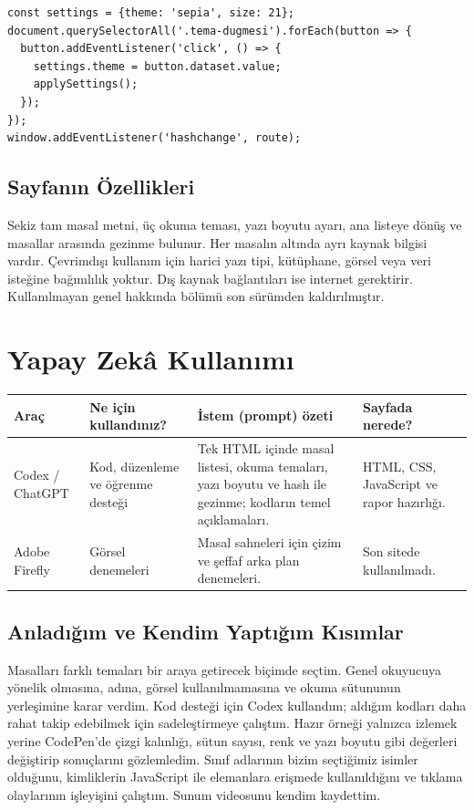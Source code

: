 \documentclass[12pt,a4paper]{article}
\begin{document}
\begin{lstlisting}[caption={İçsel JavaScript'ten önemli bir bölüm}]
const settings = {theme: 'sepia', size: 21};
document.querySelectorAll('.tema-dugmesi').forEach(button => {
  button.addEventListener('click', () => {
    settings.theme = button.dataset.value;
    applySettings();
  });
});
window.addEventListener('hashchange', route);
\end{lstlisting}

\subsection{Sayfanın Özellikleri}
Sekiz tam masal metni, üç okuma teması, yazı boyutu ayarı, ana listeye dönüş ve masallar arasında gezinme bulunur. Her masalın altında ayrı kaynak bilgisi vardır. Çevrimdışı kullanım için harici yazı tipi, kütüphane, görsel veya veri isteğine bağımlılık yoktur. Dış kaynak bağlantıları ise internet gerektirir. Kullanılmayan genel hakkında bölümü son sürümden kaldırılmıştır.


\section{Yapay Zekâ Kullanımı}


\begin{longtable}{@{}p{2.1cm}p{3cm}p{4cm}p{3cm}@{}}
\toprule
\textbf{Araç} & \textbf{Ne için kullandınız?} & \textbf{İstem (prompt) özeti} & \textbf{Sayfada nerede?} \\
\midrule
\endhead
Codex / ChatGPT & Kod, düzenleme ve öğrenme desteği & Tek HTML içinde masal listesi, okuma temaları, yazı boyutu ve hash ile gezinme; kodların temel açıklamaları. & HTML, CSS, JavaScript ve rapor hazırlığı. \\
Adobe Firefly & Görsel denemeleri & Masal sahneleri için çizim ve şeffaf arka plan denemeleri. & Son sitede kullanılmadı. \\
\bottomrule
\end{longtable}

\subsection{Anladığım ve Kendim Yaptığım Kısımlar}
Masalları farklı temaları bir araya getirecek biçimde seçtim. Genel okuyucuya yönelik olmasına, adına, görsel kullanılmamasına ve okuma sütununun yerleşimine karar verdim. Kod desteği için Codex kullandım; aldığım kodları daha rahat takip edebilmek için sadeleştirmeye çalıştım. Hazır örneği yalnızca izlemek yerine CodePen'de çizgi kalınlığı, sütun sayısı, renk ve yazı boyutu gibi değerleri değiştirip sonuçlarını gözlemledim. Sınıf adlarının bizim seçtiğimiz isimler olduğunu, kimliklerin JavaScript ile elemanlara erişmede kullanıldığını ve tıklama olaylarının işleyişini çalıştım. Sunum videosunu kendim kaydettim.
\end{document}
